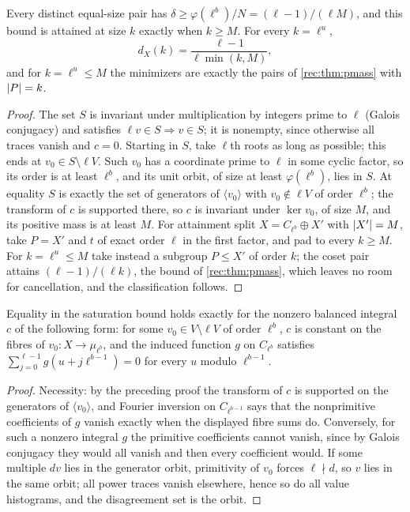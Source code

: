 \begin{theorem}\label{rec:thm:psat}
Every distinct equal-size pair has $\delta\ge\varphi(\ell^b)/N=(\ell-1)/(\ell M)$, and this bound is attained at size $k$
exactly when $k\ge M$. For every $k=\ell^u$,
\[
 d_X(k)=\frac{\ell-1}{\ell\min(k,M)},
\]
and for $k=\ell^u\le M$ the minimizers are exactly the pairs of \cref{rec:thm:pmass} with $\lvert P\rvert=k$.
\end{theorem}

\begin{proof}
The set $S$ is invariant under multiplication by integers prime to $\ell$ (Galois conjugacy) and satisfies
$\ell v\in S\Rightarrow v\in S$; it is nonempty, since otherwise all traces vanish and $c=0$. Starting in $S$, take $\ell$th
roots as long as possible; this ends at $v_0\in S\setminus\ell V$. Such $v_0$ has a coordinate prime to $\ell$ in some cyclic
factor, so its order is at least $\ell^b$, and its unit orbit, of size at least $\varphi(\ell^b)$, lies in $S$. At equality $S$
is exactly the set of generators of $\langle v_0\rangle$ with $v_0\notin\ell V$ of order $\ell^b$; the transform of $c$ is supported
there, so $c$ is invariant under $\ker v_0$, of size $M$, and its positive mass is at least $M$. For
attainment split $X=C_{\ell^b}\oplus X'$ with $\lvert X'\rvert=M$, take $P=X'$ and $t$ of exact order $\ell$ in the first factor, and
pad to every $k\ge M$. For $k=\ell^u\le M$ take instead a subgroup $P\le X'$ of order $k$; the coset pair attains
$(\ell-1)/(\ell k)$, the bound of \cref{rec:thm:pmass}, which leaves no room for cancellation, and the classification
follows.
\end{proof}

\begin{proposition}\label{rec:prop:psateq}
Equality in the saturation bound holds exactly for the nonzero balanced integral $c$ of the following
form: for some $v_0\in V\setminus\ell V$ of order $\ell^b$, $c$ is constant on the fibres of $v_0:X\to\mu_{\ell^b}$, and the induced
function $g$ on $C_{\ell^b}$ satisfies $\sum_{j=0}^{\ell-1}g(u+j\ell^{b-1})=0$ for every $u$ modulo $\ell^{b-1}$.
\end{proposition}

\begin{proof}
Necessity: by the preceding proof the transform of $c$ is supported on the generators of $\langle v_0\rangle$, and Fourier
inversion on $C_{\ell^{b-1}}$ says that the nonprimitive coefficients of $g$ vanish exactly when the displayed fibre
sums do. Conversely, for such a nonzero integral $g$ the primitive coefficients cannot vanish, since by
Galois conjugacy they would all vanish and then every coefficient would. If some multiple $dv$ lies in
the generator orbit, primitivity of $v_0$ forces $\ell\nmid d$, so $v$ lies in the same orbit; all power traces vanish
elsewhere, hence so do all value histograms, and the disagreement set is the orbit.
\end{proof}

